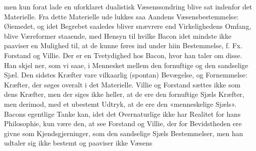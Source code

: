 \documentclass[12pt,a4paper]{book}
\begin{document}
men kun forat lade en uforklaret dualistisk Væsenssondring
blive sat indenfor det Materielle. Fra dette Materielle ude\-%
lukkes saa Aandens Væsensbestemmelse: Øiemedet, og idet
Begrebet saaledes bliver snævrere end Virkelighedens Omfang,
blive Væreformer staaende, med Hensyn til hvilke Bacon idet\-%
mindste ikke paaviser en Mulighed til, at de kunne føres ind
under hiin Bestemmelse, f. Fx. Forstand og Villie. Der er en
Tvetydighed hos Bacon, hvor han taler om disse. Han skjel\-%
ner, som vi saae, i Mennesket mellem den fornuftige og den
sandselige Sjæl. Den sidstes Kræfter vare vilkaarlig (spontan)
Bevægelse, og Fornemmelse: Kræfter, der søges overalt i det
Materielle. Villie og Forstand sættes ikke som dens Kræfter,
men der siges ikke heller, at de ere den fornuftige Sjæls
Kræfter, men derimod, med et ubestemt Udtryk, at de ere
den «menneskelige Sjæls». Bacons egentlige Tanke kan, idet det
Overnaturlige ikke har Realitet for hans Philosophie, kun være
den, at see Forstand og Villie, der for Bevidstheden ere givne
som Kjendsgjerninger, som den sandselige Sjæls Bestemmelser,
men han udtaler sig ikke bestemt og paaviser ikke Væsens\-%
\end{document}
